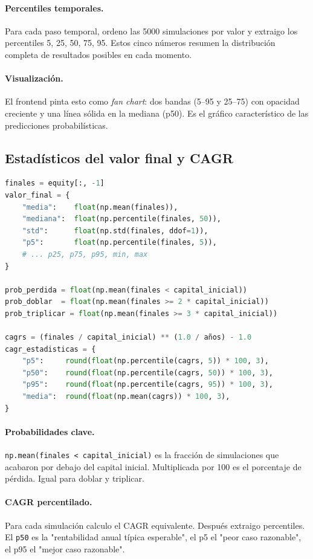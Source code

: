 \documentclass[11pt,a4paper]{book}
\begin{document}
\paragraph{Percentiles temporales.} Para cada paso temporal, ordeno las 5000 simulaciones por valor y extraigo los percentiles 5, 25, 50, 75, 95. Estos cinco números resumen la distribución completa de resultados posibles en cada momento.

\paragraph{Visualización.} El frontend pinta esto como \emph{fan chart}: dos bandas (5--95 y 25--75) con opacidad creciente y una línea sólida en la mediana (p50). Es el gráfico característico de las predicciones probabilísticas.

\subsection{Estadísticos del valor final y CAGR}

\begin{lstlisting}[language=Python]
finales = equity[:, -1]
valor_final = {
    "media":    float(np.mean(finales)),
    "mediana":  float(np.percentile(finales, 50)),
    "std":      float(np.std(finales, ddof=1)),
    "p5":       float(np.percentile(finales, 5)),
    # ... p25, p75, p95, min, max
}

prob_perdida = float(np.mean(finales < capital_inicial))
prob_doblar  = float(np.mean(finales >= 2 * capital_inicial))
prob_triplicar = float(np.mean(finales >= 3 * capital_inicial))

cagrs = (finales / capital_inicial) ** (1.0 / años) - 1.0
cagr_estadisticas = {
    "p5":     round(float(np.percentile(cagrs, 5)) * 100, 3),
    "p50":    round(float(np.percentile(cagrs, 50)) * 100, 3),
    "p95":    round(float(np.percentile(cagrs, 95)) * 100, 3),
    "media":  round(float(np.mean(cagrs)) * 100, 3),
}
\end{lstlisting}

\paragraph{Probabilidades clave.} \texttt{np.mean(finales < capital\_inicial)} es la fracción de simulaciones que acabaron por debajo del capital inicial. Multiplicada por 100 es el porcentaje de pérdida. Igual para doblar y triplicar.

\paragraph{CAGR percentilado.} Para cada simulación calculo el CAGR equivalente. Después extraigo percentiles. El \texttt{p50} es la "rentabilidad anual típica esperable", el p5 el "peor caso razonable", el p95 el "mejor caso razonable".
\end{document}
